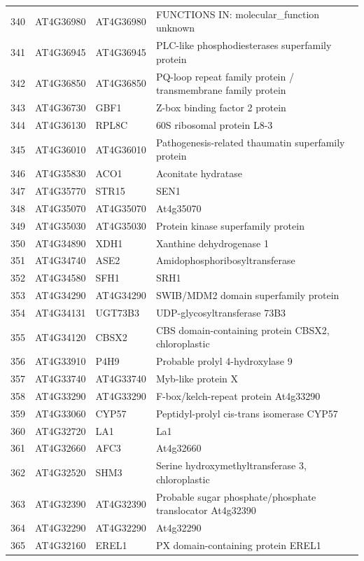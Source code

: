 \documentclass[11pt]{article}
\begin{document}
\begin{center}
\begin{tabular}{rlll}
340 & AT4G36980 & AT4G36980 & FUNCTIONS IN: molecular\_function unknown\\
341 & AT4G36945 & AT4G36945 & PLC-like phosphodiesterases superfamily protein\\
342 & AT4G36850 & AT4G36850 & PQ-loop repeat family protein / transmembrane family protein\\
343 & AT4G36730 & GBF1 & Z-box binding factor 2 protein\\
344 & AT4G36130 & RPL8C & 60S ribosomal protein L8-3\\
345 & AT4G36010 & AT4G36010 & Pathogenesis-related thaumatin superfamily protein\\
346 & AT4G35830 & ACO1 & Aconitate hydratase\\
347 & AT4G35770 & STR15 & SEN1\\
348 & AT4G35070 & AT4G35070 & At4g35070\\
349 & AT4G35030 & AT4G35030 & Protein kinase superfamily protein\\
350 & AT4G34890 & XDH1 & Xanthine dehydrogenase 1\\
351 & AT4G34740 & ASE2 & Amidophosphoribosyltransferase\\
352 & AT4G34580 & SFH1 & SRH1\\
353 & AT4G34290 & AT4G34290 & SWIB/MDM2 domain superfamily protein\\
354 & AT4G34131 & UGT73B3 & UDP-glycosyltransferase 73B3\\
355 & AT4G34120 & CBSX2 & CBS domain-containing protein CBSX2, chloroplastic\\
356 & AT4G33910 & P4H9 & Probable prolyl 4-hydroxylase 9\\
357 & AT4G33740 & AT4G33740 & Myb-like protein X\\
358 & AT4G33290 & AT4G33290 & F-box/kelch-repeat protein At4g33290\\
359 & AT4G33060 & CYP57 & Peptidyl-prolyl cis-trans isomerase CYP57\\
360 & AT4G32720 & LA1 & La1\\
361 & AT4G32660 & AFC3 & At4g32660\\
362 & AT4G32520 & SHM3 & Serine hydroxymethyltransferase 3, chloroplastic\\
363 & AT4G32390 & AT4G32390 & Probable sugar phosphate/phosphate translocator At4g32390\\
364 & AT4G32290 & AT4G32290 & At4g32290\\
365 & AT4G32160 & EREL1 & PX domain-containing protein EREL1\\

\end{tabular}
\end{center}
\end{document}
